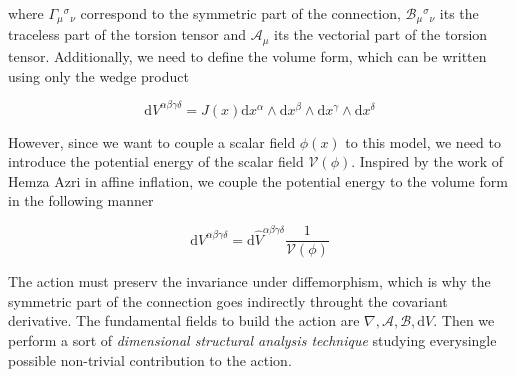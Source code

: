 \documentclass[10pt,a4paper]{article}
\begin{document}
where $\Gamma_{\mu}{}^{\sigma}{}_{\nu}$ correspond to the symmetric part of the connection, $\mathcal{B}_{\mu}{}^{\sigma}{}_{\nu}$ its the traceless
part of the torsion tensor and $\mathcal{A}_{\mu}$ its the vectorial part of the torsion tensor. Additionally, we need to define the volume
form, which can be written using only the wedge product

\begin{equation}
  \mathrm{d}V^{\alpha\beta\gamma\delta} = J(x)\mathrm{d}x^{\alpha}\wedge\mathrm{d}x^{\beta}\wedge\mathrm{d}x^{\gamma}\wedge\mathrm{d}x^{\delta}
\end{equation}

However, since we want to couple a scalar field $\phi (x)$ to this model, we need to introduce the potential energy of the 
scalar field $\mathcal{V}(\phi)$. Inspired by the work of Hemza Azri in affine inflation, we couple the potential energy to
the volume form in the following manner

\begin{equation}
  \mathrm{d}V^{\alpha\beta\gamma\delta} = \mathrm{d}\hat{V}^{\alpha\beta\gamma\delta}\frac{1}{\mathcal{V}(\phi)}
\end{equation}

The action must preserv the invariance under diffemorphism, which is why the symmetric part of the connection goes indirectly throught the 
covariant derivative. The fundamental fields to build the action are $\nabla, \mathcal{A}, \mathcal{B}, \mathrm{d}V$. Then we perform a sort
of \textit{dimensional structural analysis technique} studying everysingle possible non-trivial contribution to the action.
\end{document}
